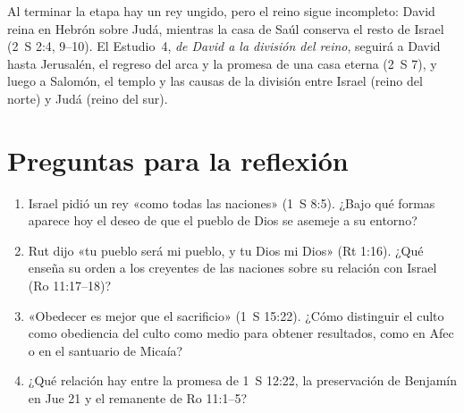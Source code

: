 Al terminar la etapa hay un rey ungido, pero el reino sigue incompleto: David reina en Hebrón sobre Judá, mientras la casa de Saúl conserva el resto de Israel (2~S 2:4, 9--10). El Estudio~4, \emph{de David a la división del reino}, seguirá a David hasta Jerusalén, el regreso del arca y la promesa de una casa eterna (2~S 7), y luego a Salomón, el templo y las causas de la división entre Israel (reino del norte) y Judá (reino del sur).

\section*{Preguntas para la reflexión}
\begin{enumerate}
\item Israel pidió un rey «como todas las naciones» (1~S 8:5). ¿Bajo qué formas aparece hoy el deseo de que el pueblo de Dios se asemeje a su entorno?
\item Rut dijo «tu pueblo será mi pueblo, y tu Dios mi Dios» (Rt 1:16). ¿Qué enseña su orden a los creyentes de las naciones sobre su relación con Israel (Ro 11:17--18)?
\item «Obedecer es mejor que el sacrificio» (1~S 15:22). ¿Cómo distinguir el culto como obediencia del culto como medio para obtener resultados, como en Afec o en el santuario de Micaía?
\item ¿Qué relación hay entre la promesa de 1~S 12:22, la preservación de Benjamín en Jue 21 y el remanente de Ro 11:1--5?
\end{enumerate}

